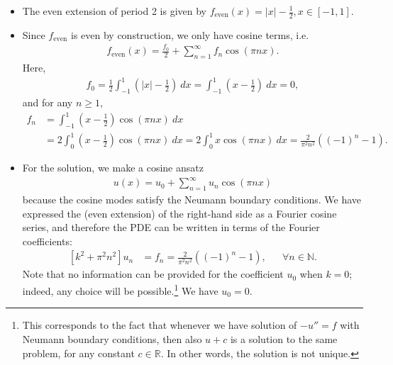 \documentclass[11pt]{article}
\begin{document}
\begin{solution}
    \begin{itemize}
        \item The even extension of period 2 is given by $f_{\text{even}}(x) = |x| - \frac 1 2, x \in [-1, 1]$.
        \item Since $f_{\text{even}}$ is even by construction, we only have cosine terms, i.e.
        \begin{align*}
            f_{\text{even}}(x) = \frac{f_0}{2} + \sum_{n=1}^{\infty} f_n \cos(\pi n x)
            .
        \end{align*}
        Here, 
        \begin{align*}
            f_0 = \frac{1}{2} \int_{-1}^{1} (|x| - \frac 1 2) \ dx = \int_{-1}^1 (x - \frac 1 2) \ dx = 0
            ,
        \end{align*}
        and for any $n \geq 1$,
        \begin{align*}
            f_n 
            &
            = 
              \int_{-1}^{1} (x- \frac 1 2) \cos(\pi n x) \ dx 
            \\&
            = 
            2 \int_{ 0}^{1} (x- \frac 1 2) \cos(\pi n x) \ dx 
            = 
            2 \int_{ 0}^{1} x \cos(\pi n x) \ dx 
            = 
            \frac{2}{\pi^2 n^2}\left( (-1)^n - 1 \right) %
            .
        \end{align*}
        \item 
        For the solution, we make a cosine ansatz 
        \begin{align*}
            u(x) = u_0 + \sum_{n=1}^{\infty} u_n \cos(\pi n x)
        \end{align*}
        because the cosine modes satisfy the Neumann boundary conditions. 
        We have expressed the (even extension) of the right-hand side as a Fourier cosine series,
        and therefore the PDE can be written in terms of the Fourier coefficients:
        \begin{align*}
            \left [k^2 + \pi^2 n^2 \right]u_n &= f_n = \frac{2}{\pi^2 n^2}\left( (-1)^n - 1 \right), & & \forall n \in \mathbb{N}.
        \end{align*}
        Note that no information can be provided for the coefficient $u_0$ when $k = 0$; indeed, any choice will be possible.\footnote{This corresponds to the fact that whenever we have solution of $-u'' = f$ with Neumann boundary conditions, then also $u+c$ is a solution to the same problem, for any constant $c \in \mathbb R$. In other words, the solution is not unique.} We have $u_0 = 0$. 
        

\end{itemize}
\end{solution}
\end{document}
